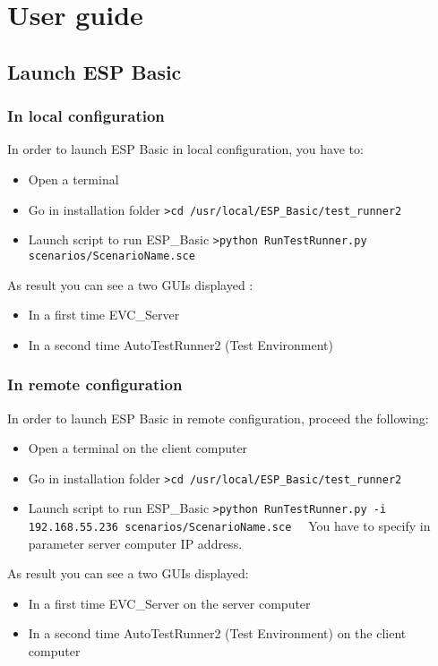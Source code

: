 \chapter{User guide}
\section{Launch ESP Basic}
\subsection{In local configuration}
In order to launch ESP Basic in local configuration, you have to:
\begin{itemize}
\item Open a terminal
\item Go in installation folder
 \newline
 \verb|>cd /usr/local/ESP_Basic/test_runner2  | 
\item Launch script to run ESP\_Basic
 \newline
 \verb|>python RunTestRunner.py scenarios/ScenarioName.sce  | 
\end{itemize}
As result you can see a two GUIs displayed : 
\begin{itemize}
\item In a first time EVC\_Server
\item In a second time AutoTestRunner2 (Test Environment)
\end{itemize}

\subsection{In remote configuration}
In order to launch ESP Basic in remote configuration, proceed the following:
\begin{itemize}
\item Open a terminal on the client computer
\item Go in installation folder
 \newline
 \verb|>cd /usr/local/ESP_Basic/test_runner2  | 
\item Launch script to run ESP\_Basic
 \newline
 \verb|>python RunTestRunner.py -i 192.168.55.236 scenarios/ScenarioName.sce  | 
 \newline
	You have to specify in parameter server computer IP address.
\end{itemize}
As result you can see a two GUIs displayed: 
\begin{itemize}
\item In a first time EVC\_Server on the server computer
\item In a second time AutoTestRunner2 (Test Environment) on the client computer
\end{itemize}

